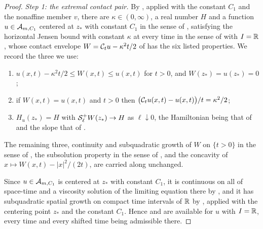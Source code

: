 \begin{proof}
\emph{Step 1: the extremal contact pair.}
By , applied with the constant $C_1$ and the nonaffine
member $v$, there are $\kappa\in(0,\infty)$, a real number $H$ and a function
$u\in\mathcal{A}_{m,C_1}$ centered at $z_*$ with constant $C_1$ in the sense of
, satisfying the horizontal Jensen bound with constant
$\kappa$ at every time in the sense of  with $I=\mathbb{R}$,
whose contact envelope $W=\mathcal{C}_tu-\kappa^2t/2$ of  has the
six listed properties. We record the three we use:
\begin{enumerate}
\item[(E3)] $u(x,t)-\kappa^2t/2\le W(x,t)\le u(x,t)$ for $t>0$, and
$W(z_*)=u(z_*)=0$;
\item[(E5)] if $W(x,t)=u(x,t)$ and $t>0$ then
$\bigl(\mathcal{C}_tu(x,t)-u(x,t)\bigr)/t=\kappa^2/2$;
\item[(E6)] $H_u(z_*)=H$ with
$\mathcal{S}_\ell^+W(z_*)\to H$ as $\ell\downarrow0$, the Hamiltonian being that of
 and the slope that of .
\end{enumerate}
The remaining three, continuity and subquadratic growth of $W$ on $\{t>0\}$ in
the sense of , the subsolution property in the sense
of , and the concavity of
$x\mapsto W(x,t)-|x|^2/(2t)$, are carried along unchanged.

Since $u\in\mathcal{A}_{m,C_1}$ is centered at $z_*$ with constant $C_1$, it is
continuous on all of space-time and a viscosity solution of the limiting
equation there by , and it has subquadratic spatial growth
on compact time intervals of $\mathbb{R}$ by , applied with
the centering point $z_*$ and the constant $C_1$. Hence
 and  are available for
$u$ with $I=\mathbb{R}$, every time and every shifted time being admissible there.


\end{proof}

